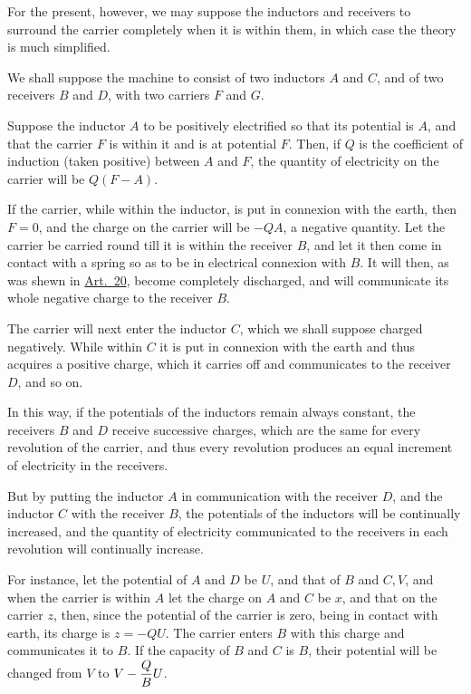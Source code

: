 \documentclass[12pt,oneside]{book}[2021/10/04]
\newcommand{\xp}{\rule[-2.0ex]{0pt}{5.2ex}}
\newcommand{\¬}{\hphantom{0}}
\begin{document}
For the present, however, we may suppose the inductors and
receivers to surround the carrier completely when it is within them,
in which case the theory is much simplified.

We shall suppose the machine to consist of two inductors \(A\) and
\(C\), and of two receivers \(B\) and \(D\), with two carriers \(F\) and \(G\).

Suppose the inductor \(A\) to be positively electrified so that its
potential is \(A\), and that the carrier \(F\) is within it and is at
potential \(F\). Then, if \(Q\) is the coefficient of induction (taken
positive) between \(A\) and \(F\), the quantity of electricity on the carrier
will be \(Q(F - A)\).

If the carrier, while within the inductor, is put in connexion with
the earth, then \(F = 0\), and the charge on the carrier will be \(-QA\),
a negative quantity. Let the carrier be carried round till it is
within the receiver \(B\), and let it then come in contact with a spring
so as to be in electrical connexion with \(B\). It will then, as was
shewn in \hyperref[art:20]{Art.\ 20}, become completely discharged, and will communicate
its whole negative charge to the receiver \(B\).

The carrier will next enter the inductor \(C\), which we shall suppose
charged negatively. While within \(C\) it is put in connexion with
the earth and thus acquires a positive charge, which it carries off
and communicates to the receiver \(D\), and so on.

In this way, if the potentials of the inductors remain always
constant, the receivers \(B\) and \(D\) receive successive charges, which
are the same for every revolution of the carrier, and thus every
revolution produces an equal increment of electricity in the receivers.

But by putting the inductor \(A\) in communication with the receiver
\(D\), and the inductor \(C\) with the receiver \(B\), the potentials
of the inductors will be continually increased, and the quantity
of electricity communicated to the receivers in each revolution will
continually increase.

For instance, let the potential of \(A\) and \(D\) be \(U\), and that of \(B\)
and \(C, V\), and when the carrier is within \(A\) let the charge on \(A\)
and \(C\) be \(x\), and that on the carrier \(z\), then, since the potential
of the carrier is zero, being in contact with earth, its charge is
\(z = -QU\). The carrier enters \(B\) with this charge and communicates
it to \(B\). If the capacity of \(B\) and \(C\) is \(B\), their potential will be
changed from \(V\) to \(V - \xp\dfrac{Q}{B} U\).
\end{document}
